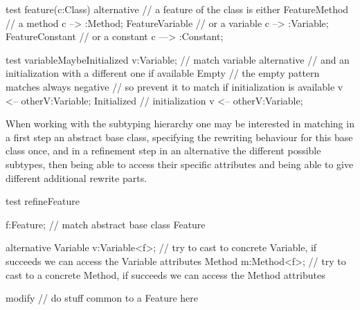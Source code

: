 \begin{example}
  \begin{grgen}
test feature(c:Class)
{
  alternative // a feature of the class is either
  {
    FeatureMethod { // a method
      c --> :Method;
    }
    FeatureVariable { // or a variable
      c --> :Variable;
    }
    FeatureConstant { // or a constant
      c ---> :Constant;
    }
  }
}  
  \end{grgen}
\end{example}

\begin{example}
  \begin{grgen}
test variableMaybeInitialized
{
  v:Variable; // match variable
  alternative { // and an initialization with a different one if available
    Empty {
      // the empty pattern matches always
      negative { // so prevent it to match if initialization is available
        v <-- otherV:Variable;
      }
    }
    Initialized { // initialization
      v <-- otherV:Variable;
    }
  }
}
  \end{grgen}
\end{example}

\begin{example} \label{ex:retypelhs}
When working with the subtyping hierarchy one may be interested in matching in a first step an abstract base class,
specifying the rewriting behaviour for this base class once,
and in a refinement step in an alternative the different possible subtypes, 
then being able to access their specific attributes and being able to give different additional rewrite parts.
	\begin{grgen}
test refineFeature
{
  f:Feature; // match abstract base class Feature

  alternative {
    Variable {
      v:Variable<f>; // try to cast to concrete Variable, if succeeds we can access the Variable attributes
    }
    Method {
      m:Method<f>; // try to cast to a concrete Method, if succeeds we can access the Method attributes
    }
  }
  
  modify {
    // do stuff common to a Feature here
  }
}
	\end{grgen}
\end{example}


